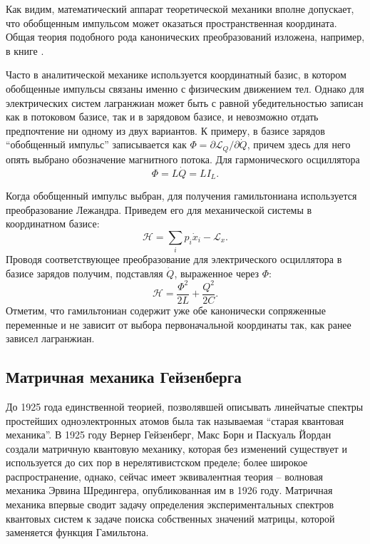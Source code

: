 \documentclass[14pt, a4paper]{extreport}
\numberwithin{equation}{section}
\begin{document}
Как видим, математический аппарат теоретической механики вполне допускает, что обобщенным импульсом может оказаться пространственная координата. Общая теория подобного рода канонических преобразований изложена, например, в книге \cite{shmutzer1976}.

Часто в аналитической механике используется координатный базис, в котором обобщенные импульсы связаны именно с физическим движением тел. Однако для электрических систем лагранжиан может быть с равной убедительностью записан как в потоковом базисе, так и в зарядовом базисе, и невозможно отдать предпочтение ни одному из двух вариантов. К примеру, в базисе зарядов ``обобщенный импульс'' записывается как $\Phi = \partial \mathcal{L}_Q / \partial \dot Q$, причем здесь для него опять выбрано обозначение магнитного потока. Для гармонического осциллятора
\begin{equation}
	\Phi = L\dot Q = LI_L. \label{eq:Phi}
\end{equation}

Когда обобщенный импульс выбран, для получения гамильтониана используется преобразование Лежандра. Приведем его для механической системы в координатном базисе:
\begin{equation}
	\mathcal{H} = \sum_i p_i \dot x_i - \mathcal{L}_x.
\end{equation}
Проводя соответствующее преобразование для электрического осциллятора в базисе зарядов получим, подставляя $\dot Q$, выраженное через $\Phi$:
\begin{equation}
	\mathcal{H} = \frac{\Phi^2}{2 L} + \frac{Q^2}{2C}.\label{eq:planck_electric_osc}
\end{equation}
Отметим, что гамильтониан содержит уже обе канонически сопряженные переменные и не зависит от выбора первоначальной координаты так, как ранее зависел лагранжиан.

\subsection{Матричная механика Гейзенберга}

До 1925 года единственной теорией, позволявшей описывать линейчатые спектры простейших одноэлектронных атомов была так называемая ``старая квантовая механика''. В 1925 году Вернер Гейзенберг, Макс Борн и Паскуаль Йордан создали матричную квантовую механику, которая без изменений существует и используется до сих пор в нерелятивистском пределе; более широкое распространение, однако, сейчас имеет эквивалентная теория -- волновая механика Эрвина Шредингера, опубликованная им в 1926 году. Матричная механика впервые сводит задачу определения экспериментальных спектров квантовых систем к задаче поиска собственных значений матрицы, которой заменяется функция Гамильтона. 
\end{document}
